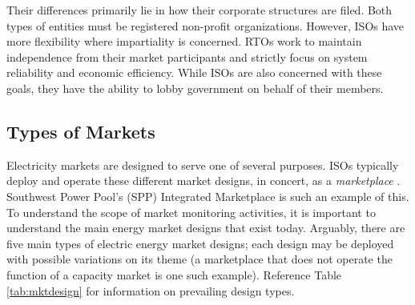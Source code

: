 Their differences primarily lie in how their corporate structures are filed. Both types of entities must be registered non-profit organizations. However, ISOs have more flexibility where impartiality is concerned. RTOs work to maintain independence from their market participants and strictly focus on system reliability and economic efficiency. While ISOs are also concerned with these goals, they have the ability to lobby government on behalf of their members.

\subsection{Types of Markets}

Electricity markets are designed to serve one of several purposes. ISOs typically deploy and operate these different market designs, in concert, as a \textit{marketplace} \cite{ferc2}. Southwest Power Pool's (SPP) Integrated Marketplace is such an example of this. To understand the scope of market monitoring activities, it is important to understand the main energy market designs that exist today. Arguably, there are five main types of electric energy market designs; each design may be deployed with possible variations on its theme (a marketplace that does not operate the function of a capacity market is one such example). Reference Table \ref{tab:mktdesign} for information on prevailing design types.

